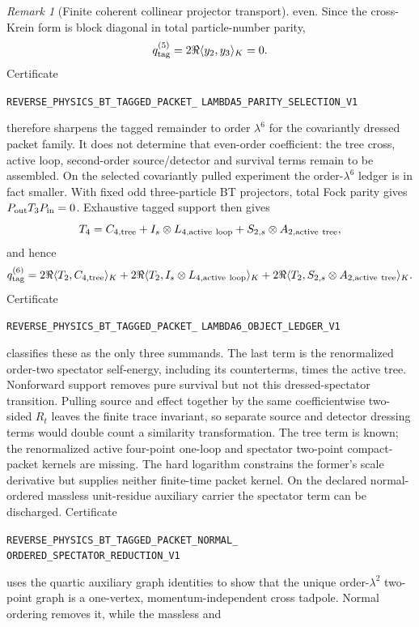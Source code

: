 \documentclass[11pt]{article}
\theoremstyle{definition}
\theoremstyle{remark}
\newtheorem{remark}[theorem]{Remark}
\begin{document}
\begin{remark}[Finite coherent collinear projector transport]
even.  Since the cross-Krein form is block diagonal in total particle-number
parity,
\[
 q_{\rm tag}^{(5)}=2\Re\langle y_2,y_3\rangle_K=0.
\]
Certificate
\par\noindent
\texttt{REVERSE\_PHYSICS\_BT\_TAGGED\_PACKET\_}
\allowbreak\texttt{LAMBDA5\_PARITY\_SELECTION\_V1}
\par\noindent
therefore sharpens the tagged remainder to order $\lambda^6$ for the
covariantly dressed packet family.  It does not determine that even-order
coefficient: the tree cross, active loop, second-order source/detector and
survival terms remain to be assembled.
On the selected covariantly pulled experiment the order-$\lambda^6$ ledger is
in fact smaller.  With fixed odd three-particle BT projectors, total Fock
parity gives $P_{\rm out}T_3P_{\rm in}=0$.  Exhaustive tagged support then
gives
\[
 T_4=C_{4,\rm tree}+I_s\otimes L_{4,\rm active\ loop}
 +S_{2,s}\otimes A_{2,\rm active\ tree},
\]
and hence
\[
 q_{\rm tag}^{(6)}=2\Re\langle T_2,C_{4,\rm tree}\rangle_K
 +2\Re\langle T_2,I_s\otimes L_{4,\rm active\ loop}\rangle_K
 +2\Re\langle T_2,S_{2,s}\otimes A_{2,\rm active\ tree}\rangle_K.
\]
Certificate
\par\noindent
\texttt{REVERSE\_PHYSICS\_BT\_TAGGED\_PACKET\_}
\allowbreak\texttt{LAMBDA6\_OBJECT\_LEDGER\_V1}
\par\noindent
classifies these as the only three summands.  The last term is the
renormalized order-two spectator self-energy, including its counterterms,
times the active tree.  Nonforward support removes pure survival but not this
dressed-spectator transition.  Pulling source and effect together by the same
coefficientwise two-sided $R_t$ leaves the finite trace invariant, so separate source and
detector dressing terms would double count a similarity transformation.  The
tree term is known; the renormalized active four-point one-loop and spectator
two-point compact-packet kernels are missing.  The hard logarithm constrains
the former's scale derivative but supplies neither finite-time packet kernel.
On the declared normal-ordered massless unit-residue auxiliary carrier the
spectator term can be discharged.  Certificate
\par\noindent
\texttt{REVERSE\_PHYSICS\_BT\_TAGGED\_PACKET\_NORMAL\_}
\allowbreak\texttt{ORDERED\_SPECTATOR\_REDUCTION\_V1}
\par\noindent
uses the quartic auxiliary graph identities to show that the unique
order-$\lambda^2$ two-point graph is a one-vertex, momentum-independent
cross tadpole.  Normal ordering removes it, while the massless and

\end{remark}
\end{document}
